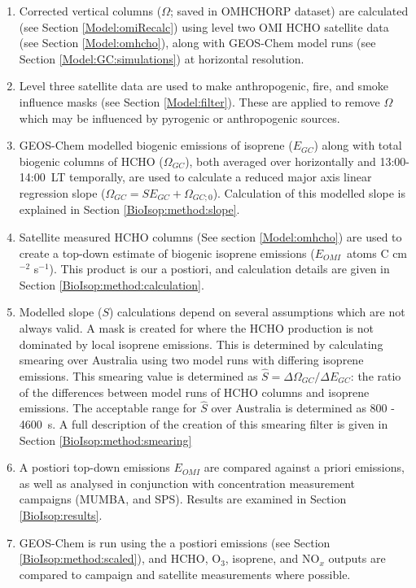    \begin{enumerate}
      \item 
        Corrected vertical columns ($\Omega$; saved in OMHCHORP dataset) are calculated (see Section \ref{Model:omiRecalc}) using level two OMI HCHO satellite data (see Section \ref{Model:omhcho}), along with GEOS-Chem model runs (see Section \ref{Model:GC:simulations}) at \highhr horizontal resolution.
      \item 
        Level three satellite data are used to make anthropogenic, fire, and smoke influence masks (see Section \ref{Model:filter}).
        These are applied to remove $\Omega$ which may be influenced by pyrogenic or anthropogenic sources. 
      \item 
        GEOS-Chem modelled biogenic emissions of isoprene ($E_{GC}$) along with total biogenic columns of HCHO ($\Omega_{GC}$), both averaged over \lowhr horizontally and 13:00-14:00~LT temporally, are used to calculate a reduced major axis linear regression slope ($\Omega_{GC}=S E_{GC} + \Omega_{GC;0}$).
        Calculation of this modelled slope is explained in Section \ref{BioIsop:method:slope}.
      \item 
        Satellite measured HCHO columns (See section \ref{Model:omhcho}) are used to create a top-down estimate of biogenic isoprene emissions ($E_{OMI}$~atoms C cm$^{-2}$ s$^{-1}$).
        This product is our a postiori, and calculation details are given in Section \ref{BioIsop:method:calculation}.
      
      \item
        Modelled slope ($S$) calculations depend on several assumptions which are not always valid.
        A mask is created for where the HCHO production is not dominated by local isoprene emissions. 
        This is determined by calculating smearing over Australia using two model runs with differing isoprene emissions.
        This smearing value is determined as $\hat{S}=\Delta \Omega_{GC}/ \Delta E_{GC}$: the ratio of the differences between model runs of HCHO columns and isoprene emissions.
        The acceptable range for $\hat{S}$ over Australia is determined as 800 - 4600~s.
        A full description of the creation of this smearing filter is given in Section \ref{BioIsop:method:smearing}
      \item 
        A postiori top-down emissions $E_{OMI}$ are compared against a priori emissions, as well as analysed in conjunction with concentration measurement campaigns (MUMBA, and SPS).%
        Results are examined in Section \ref{BioIsop:results}.
      \item 
        GEOS-Chem is run using the a postiori emissions (see Section \ref{BioIsop:method:scaled}), and HCHO, O$_3$, isoprene, and NO$_x$ outputs are compared to campaign and satellite measurements where possible.
    \end{enumerate}
    
